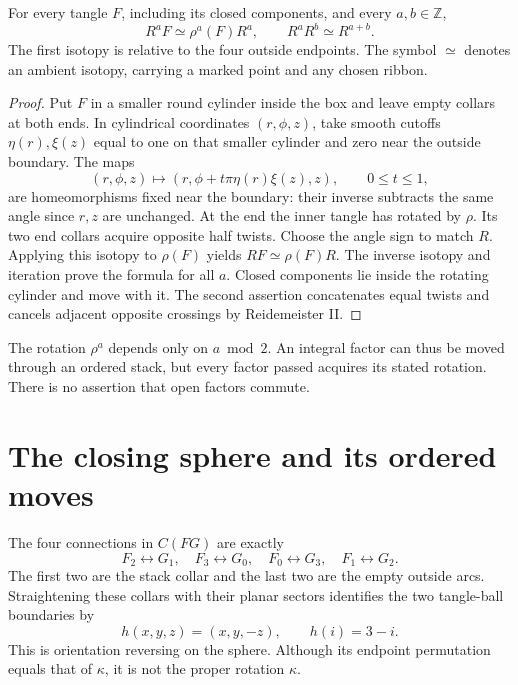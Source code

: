 \begin{lemma}\label{cr:slide}
For every tangle $F$, including its closed components, and every $a,b\in\mathbb Z$,
\begin{equation}\label{cr:slide-formula}
 R^aF\simeq\rho^a(F)R^a,\qquad
                     R^aR^b\simeq R^{a+b}.
\end{equation}
The first isotopy is relative to the four outside endpoints. The symbol $\simeq$ denotes an ambient isotopy, carrying a marked point and any chosen ribbon.
\end{lemma}
\begin{proof}
Put $F$ in a smaller round cylinder inside the box and leave empty collars at both ends. In cylindrical coordinates $(r,\phi,z)$, take smooth cutoffs $\eta(r),\xi(z)$ equal to one on that smaller cylinder and zero near the outside boundary. The maps
\[
 (r,\phi,z)\longmapsto
            (r,\phi+t\pi\eta(r)\xi(z),z),\qquad0\le t\le1,
\]
are homeomorphisms fixed near the boundary: their inverse subtracts the same angle since $r,z$ are unchanged. At the end the inner tangle has rotated by $\rho$. Its two end collars acquire opposite half twists. Choose the angle sign to match $R$. Applying this isotopy to $\rho(F)$ yields $R F\simeq\rho(F)R$. The inverse isotopy and iteration prove the formula for all $a$. Closed components lie inside the rotating cylinder and move with it. The second assertion concatenates equal twists and cancels adjacent opposite crossings by Reidemeister II.
\end{proof}

The rotation $\rho^a$ depends only on $a\bmod2$. An integral factor can thus be moved through an ordered stack, but every factor passed acquires its stated rotation. There is no assertion that open factors commute.

\section{The closing sphere and its ordered moves}\label{cr:closing}

The four connections in $C(FG)$ are exactly
\begin{equation}\label{cr:closing-pairs}
 F_2\leftrightarrow G_1,\quad F_3\leftrightarrow G_0,
 \quad F_0\leftrightarrow G_3,\quad F_1\leftrightarrow G_2.
\end{equation}
The first two are the stack collar and the last two are the empty outside arcs. Straightening these collars with their planar sectors identifies the two tangle-ball boundaries by
\begin{equation}\label{cr:reflection}
            h(x,y,z)=(x,y,-z),\qquad h(i)=3-i.
\end{equation}
This is orientation reversing on the sphere. Although its endpoint permutation equals that of $\kappa$, it is not the proper rotation $\kappa$.

